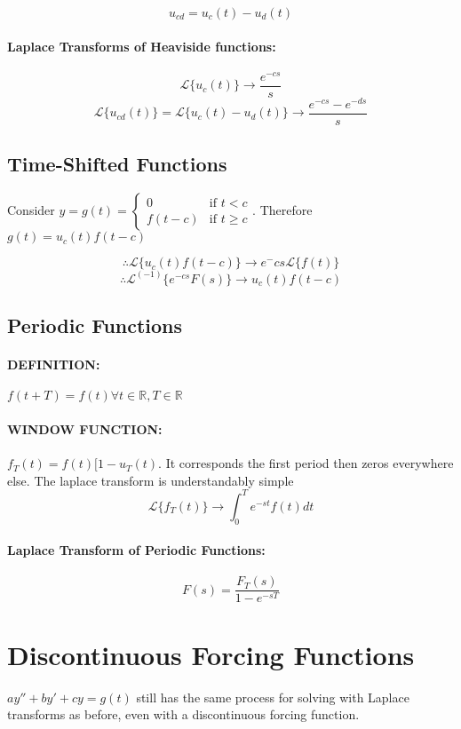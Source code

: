 \documentclass[a4paper,12pt]{report}
\begin{document}
\[
u_{cd} = u_c(t) - u_d(t)
\]


\paragraph{Laplace Transforms of Heaviside functions: } 
$$\mathcal{L}\{ u_c(t) \} \to \frac{e^{-cs}}{s}$$
$$\mathcal{L}\{ u_{cd}(t) \} = \mathcal{L}\{ u_c(t) - u_d(t) \} \to \frac{e^{-cs} - e^{-ds}}{s}$$

\subsection{Time-Shifted Functions}
Consider $y = g(t) = 
\begin{cases}
0 & \text{if } t < c \\ 
f(t-c) & \text{if } t \geq c
\end{cases}$. Therefore $g(t) = u_c(t)f(t-c)$

$$\therefore \mathcal{L}\{ u_c(t)f(t-c) \} \to e^-cs\mathcal{L}\{ f(t) \}$$
$$\therefore \mathcal{L}^{(-1)}\{ e^{-cs} F(s) \} \to u_c(t)f(t-c)$$


\subsection{Periodic Functions}
\paragraph{DEFINITION: } $f(t+T) = f(t) \forall t \in \mathbb{R}, T \in \mathbb{R} $

\paragraph{WINDOW FUNCTION: } $f_T(t) = f(t)[1-u_T(t)$. It corresponds the first period then zeros everywhere else. 
The laplace transform is understandably simple $$\mathcal{L}\{f_T(t)\} \to \int_0^T e^{-st}f(t)dt$$

\paragraph{Laplace Transform of Periodic Functions: } $$F(s) = \frac{F_T(s)}{1-e^{-sT}}$$

\section{Discontinuous Forcing Functions}
$ay'' + by' + cy = g(t)$ still has the same process for solving with Laplace transforms as before, even with a discontinuous forcing function.
\end{document}

